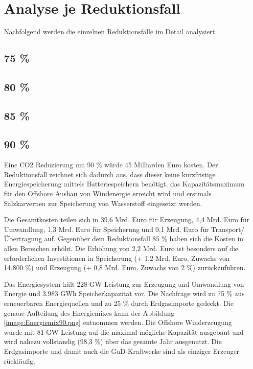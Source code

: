 \section{Analyse je Reduktionsfall}
Nachfolgend werden die einzelnen Reduktionsfälle im Detail analysiert.


\subsection{75 \%}

\subsection{80 \%}

\subsection{85 \%}

\subsection{90 \%}
Eine CO2 Reduzierung um 90 \% würde 45 Milliarden Euro kosten. Der Reduktionsfall zeichnet sich dadurch aus, dass dieser keine kurzfristige Energiespeicherung mittels Batteriespeichern benötigt, das Kapazitätsmaximum für den Offshore Ausbau von Windenergie erreicht wird und erstmals Salzkarvernen zur Speicherung von Wasserstoff eingesetzt werden.

Die Gesamtkosten teilen sich in 39,6 Mrd. Euro für Erzeugung, 4,4 Mrd. Euro für Umwandlung, 1,3 Mrd. Euro für Speicherung und 0,1 Mrd. Euro für Transport/Übertragung auf. Gegenüber dem Reduktionsfall 85 \% haben sich die Kosten in allen Bereichen erhöht. Die Erhöhung von 2,2 Mrd. Euro ist besonders auf die erforderlichen Investitionen in Speicherung (+ 1,2 Mrd. Euro, Zuwachs von 14.800 \%) und Erzeugung (+ 0,8 Mrd. Euro, Zuwachs von 2 \%) zurückzuführen.

Das Energiesystem hält 228 GW Leistung zur Erzeugung und Umwandlung von Energie und 3.983 GWh Speicherkapazität vor. Die Nachfrage wird zu 75 \% aus erneuerbaren Energiequellen und zu 25 \% durch Erdgasimporte gedeckt. Die genaue Aufteilung des Energiemixes kann der Abbildung \ref{image:Energiemix90.png} entnommen werden. Die Offshore Winderzeugung wurde mit 81 GW Leistung auf die maximal mögliche Kapazität ausgebaut und wird nahezu vollständig (98,3 \%) über das gesamte Jahr ausgenutzt. 
Die Erdgasimporte und damit auch die GuD-Kraftwerke sind als einziger Erzeuger rückläufig.  

